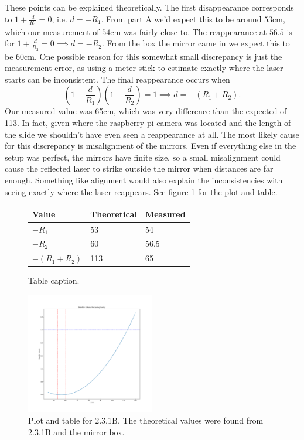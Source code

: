 \documentclass[letterpaper, reqno,11pt]{article}
\begin{document}
These points can be explained theoretically. The first disappearance corresponds to $1+\frac{d}{R_1}=0$, i.e. $d=-R_1$. From part A we'd expect this to be around $53$cm, which our measurement of $54$cm was fairly close to. The reappearance at $56.5$ is for $1+\frac{d}{R_2}=0\implies d=-R_2$. From the box the mirror came in we expect this to be $60$cm. One possible reason for this somewhat small discrepancy is just the measurement error, as using a meter stick to estimate exactly where the laser starts can be inconsistent. The final reappearance occurs when
\[
\left(1+ \frac{d}{R_1}\right) \left( 1+ \frac{d}{R_2} \right) = 1\implies d=-(R_1+R_2)
.\]
Our measured value was 65cm, which was very difference than the expected of 113. In fact, given where the raspberry pi camera was located and the length of the slide we shouldn't have even seen a reappearance at all. The most likely cause for this discrepancy is misalignment of the mirrors. Even if everything else in the setup was perfect, the mirrors have finite size, so a small misalignment could cause the reflected laser to strike outside the mirror when distances are far enough. Something like alignment would also explain the inconsistencies with seeing exactly where the laser reappears. See figure \ref{fig:1A} for the plot and table.

\begin{figure}[htpb]
    \centering
    \begin{minipage}[b]{0.45\textwidth}
    \begin{tabular}{|l|l|l|}
    \hline
    Value & Theoretical & Measured \\
    \hline
    $-R_1$ & 53 & 54 \\
    $-R_2$ & 60 & 56.5 \\
    $-(R_1+R_2)$ & 113 & 65 \\
    \hline
    \end{tabular}
    \caption{Table caption.}
    \label{fig:table1}
    \end{minipage}
    \hfill
    \includegraphics[width=0.5\textwidth]{1B}
    \caption{Plot and table for 2.3.1B. The theoretical values were found from 2.3.1B and the mirror box.}
    \label{fig:1A}
\end{figure}
\end{document}
